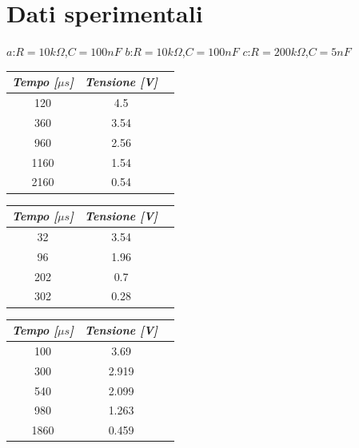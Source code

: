     \section{Dati sperimentali}
    $a$:$R = 10k\Omega$,$C = 100nF$
    \hspace{0.90 cm} $b$:$R = 10k\Omega$,$C = 100nF$
    \hspace{0.90 cm} $c$:$R = 200k\Omega$,$C = 5nF$

    \begin{table} [!htb]
        \begin{minipage}{.32\linewidth}
            \begin{tabular}{|c|c|c|}
                \hline
                \textit{Tempo [$\mu s$]} & \textit{Tensione [V]} \\
                \hline
                120 & 4.5 \\
                \hline
                360 & 3.54 \\
                \hline
                960 & 2.56 \\
                \hline
                1160 & 1.54 \\
                \hline
                2160 & 0.54 \\
                \hline
            \end{tabular}
        \end{minipage}
        \begin{minipage}{.32\linewidth}
            \begin{tabular}{|c|c|c|}
                \hline
                \textit{Tempo [$\mu s$]} & \textit{Tensione [V]} \\
                \hline
                32 & 3.54 \\
                \hline
                96 & 1.96 \\
                \hline
                202 & 0.7 \\
                \hline
                302 & 0.28 \\
                \hline
            \end{tabular}
        \end{minipage}
        \begin{minipage}{.32\linewidth}
            \begin{tabular}{|c|c|c|}
                \hline
                \textit{Tempo [$\mu s$]} & \textit{Tensione [V]} \\
                \hline
                100 & 3.69 \\
                \hline
                300 & 2.919 \\
                \hline
                540 & 2.099 \\
                \hline
                980 & 1.263 \\
                \hline
                1860 & 0.459 \\
                \hline
            \end{tabular}
        \end{minipage}
        
    \end{table}

